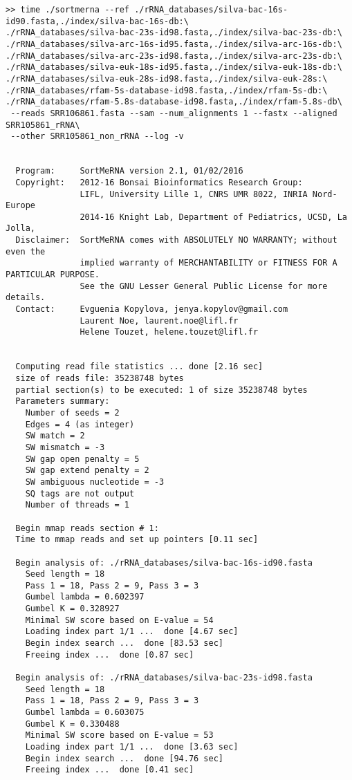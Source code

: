\documentclass[10pt,a4paper]{article}
\begin{document}
\begin{Verbatim}[fontsize=\footnotesize]
>> time ./sortmerna --ref ./rRNA_databases/silva-bac-16s-id90.fasta,./index/silva-bac-16s-db:\
./rRNA_databases/silva-bac-23s-id98.fasta,./index/silva-bac-23s-db:\
./rRNA_databases/silva-arc-16s-id95.fasta,./index/silva-arc-16s-db:\
./rRNA_databases/silva-arc-23s-id98.fasta,./index/silva-arc-23s-db:\
./rRNA_databases/silva-euk-18s-id95.fasta,./index/silva-euk-18s-db:\
./rRNA_databases/silva-euk-28s-id98.fasta,./index/silva-euk-28s:\
./rRNA_databases/rfam-5s-database-id98.fasta,./index/rfam-5s-db:\
./rRNA_databases/rfam-5.8s-database-id98.fasta,./index/rfam-5.8s-db\
 --reads SRR106861.fasta --sam --num_alignments 1 --fastx --aligned SRR105861_rRNA\
 --other SRR105861_non_rRNA --log -v


  Program:     SortMeRNA version 2.1, 01/02/2016
  Copyright:   2012-16 Bonsai Bioinformatics Research Group:
               LIFL, University Lille 1, CNRS UMR 8022, INRIA Nord-Europe
               2014-16 Knight Lab, Department of Pediatrics, UCSD, La Jolla,
  Disclaimer:  SortMeRNA comes with ABSOLUTELY NO WARRANTY; without even the
               implied warranty of MERCHANTABILITY or FITNESS FOR A PARTICULAR PURPOSE.
               See the GNU Lesser General Public License for more details.
  Contact:     Evguenia Kopylova, jenya.kopylov@gmail.com 
               Laurent Noe, laurent.noe@lifl.fr
               Helene Touzet, helene.touzet@lifl.fr


  Computing read file statistics ... done [2.16 sec]
  size of reads file: 35238748 bytes
  partial section(s) to be executed: 1 of size 35238748 bytes 
  Parameters summary:
    Number of seeds = 2
    Edges = 4 (as integer)
    SW match = 2
    SW mismatch = -3
    SW gap open penalty = 5
    SW gap extend penalty = 2
    SW ambiguous nucleotide = -3
    SQ tags are not output
    Number of threads = 1

  Begin mmap reads section # 1:
  Time to mmap reads and set up pointers [0.11 sec]

  Begin analysis of: ./rRNA_databases/silva-bac-16s-id90.fasta
    Seed length = 18
    Pass 1 = 18, Pass 2 = 9, Pass 3 = 3
    Gumbel lambda = 0.602397
    Gumbel K = 0.328927
    Minimal SW score based on E-value = 54
    Loading index part 1/1 ...  done [4.67 sec]
    Begin index search ...  done [83.53 sec]
    Freeing index ...  done [0.87 sec]

  Begin analysis of: ./rRNA_databases/silva-bac-23s-id98.fasta
    Seed length = 18
    Pass 1 = 18, Pass 2 = 9, Pass 3 = 3
    Gumbel lambda = 0.603075
    Gumbel K = 0.330488
    Minimal SW score based on E-value = 53
    Loading index part 1/1 ...  done [3.63 sec]
    Begin index search ...  done [94.76 sec]
    Freeing index ...  done [0.41 sec]


\end{Verbatim}
\end{document}
